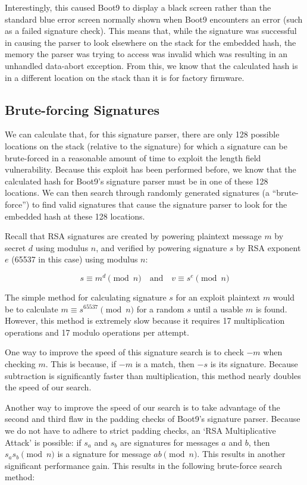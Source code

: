 \documentclass[journal]{IEEEtran}
\begin{document}
Interestingly, this caused Boot9 to display a black screen rather than the
standard blue error screen normally shown when Boot9 encounters an error (such
as a failed signature check). This means that, while the signature was
successful in causing the parser to look elsewhere on the stack for the embedded
hash, the memory the parser was trying to access was invalid which was resulting
in an unhandled data-abort exception. From this, we know that the calculated
hash is in a different location on the stack than it is for factory firmware.

\subsection{Brute-forcing Signatures}

We can calculate that, for this signature parser, there are only 128 possible
locations on the stack (relative to the signature) for which a signature can be
brute-forced in a reasonable amount of time to exploit the length field
vulnerability. Because this exploit has been performed before, we know that the
calculated hash for Boot9's signature parser must be in one of these 128
locations. We can then search through randomly generated signatures (a
``brute-force'') to find valid signatures that cause the signature parser to
look for the embedded hash at these 128 locations.

Recall that RSA signatures are created by powering plaintext message \(m\) by
secret \(d\) using modulus \(n\), and verified by powering signature \(s\) by
RSA exponent \(e\) (65537 in this case) using modulus \(n\):

\[s \equiv m^{d} \pmod{n} \quad \text{and} \quad v \equiv s^{e} \pmod{n}\]

The simple method for calculating signature \(s\) for an exploit plaintext
\(m\) would be to calculate \(m \equiv s^{65537} \pmod{n}\) for a random \(s\)
until a usable \(m\) is found. However, this method is extremely slow because it
requires 17 multiplication operations and 17 modulo operations per attempt.

One way to improve the speed of this signature search is to check \(-m\) when
checking \(m\). This is because, if \(-m\) is a match, then \(-s\) is its
signature. Because subtraction is significantly faster than multiplication, this
method nearly doubles the speed of our search.

Another way to improve the speed of our search is to take advantage of the
second and third flaw in the padding checks of Boot9's signature parser. Because
we do not have to adhere to strict padding checks, an `RSA Multiplicative
Attack' is possible: if \(s_{a}\) and \(s_{b}\) are signatures for messages
\(a\) and \(b\), then \(s_{a}s_{b} \pmod{n}\) is a signature for message \(ab
\pmod{n}\). This results in another significant performance gain. This results
in the following brute-force search method:
\end{document}
